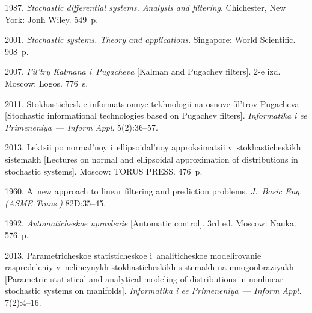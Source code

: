   \begin{multicols}{2}

\renewcommand{\bibname}{\protect\rmfamily References}



{\small\frenchspacing
 {%
 \begin{thebibliography}{9}
 1987.
\textit{Stochastic differential systems. Analysis and filtering}.
Chichester, New York: Jonh Wiley. 549~p.

 2001.
\textit{Stochastic systems. Theory and applications}.
Singapore: World Scientific.  908~p.

 2007. \textit{Fil'try Kalmana i~Pugacheva}
[Kalman and Pugachev filters]. 2-e izd. Moscow: Logos.  776~s.

 2011. Stokhasticheskie informatsionnye tekhnologii
na osnove fil'trov Pugacheva [Stochastic informational technologies based on
Pugachev filters]. \textit{Informatika i ee Primeneniya}~---
\textit{Inform Appl}.   5(2):36--57.

 2013.
Lektsii po normal'noy i~ellipsoidal'noy approksimatsii
v~sto\-kha\-sti\-che\-skikh sistemakh  [Lectures on normal and ellipsoidal
approximation of distributions in stochastic systems]. Moscow:
TORUS PRESS.  476~p.



 1960. A~new approach to linear filtering and prediction problems.
\textit{J.~Basic Eng. (ASME Trans.)} 82D:35--45.

 1992. \textit{Avtomaticheskoe upravlenie}
[Automatic control]. 3rd ed. Moscow: Nauka.
576~p.

 2013. Parametricheskoe statisticheskoe
i~analiticheskoe modelirovanie raspredeleniy v~nelineynykh stokhasticheskikh
sistemakh na mnogoobraziyakh
[Parametric statistical and analytical modeling of distributions in
nonlinear stochastic systems on manifolds].
\textit{Informatika i ee Primeneniya}~--- \textit{Inform Appl.} 7(2):4--16.
\end{thebibliography}

 }
 }

\end{multicols}

